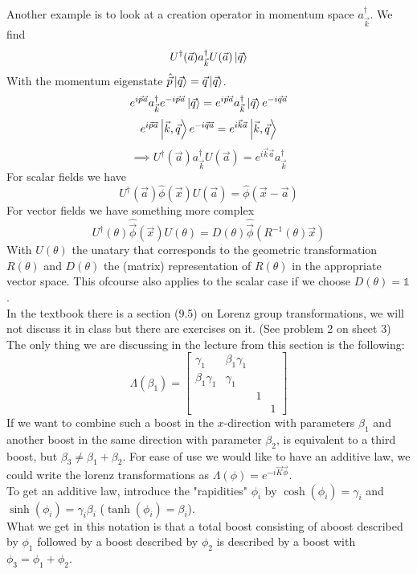 \documentclass{report}
\begin{document}
Another example is to look at a creation operator in momentum space $a^\dagger_{\vec{k}}$. We find  \[
	U^\dagger(\vec{a}) a^\dagger_{\vec{k}} U(\vec{a}) \ket{\vec{q}}
\] With the momentum eigenstate $\hat{\vec{p}} \ket{\vec{q}} = \vec{q} \ket{\vec{q}}$. \[
e^{i\vec{p}\vec{a}} a^\dagger_{\vec{k}} e^{-i \vec{p} \vec{a}} \ket{\vec{q}} = e^{i\vec{p}\vec{a}} a^\dagger_{\vec{k}} \ket{\vec{q}} e^{-i\vec{q}\vec{a}}
\] \[
e^{i\vec{p}\vec{a}} \ket{\vec{k}, \vec{q}} e^{-i \vec{q} \vec{a}} = e^{i\vec{k}\vec{a}} \ket{\vec{k}, \vec{q}}
\] \[
\implies U^\dagger (\vec{a}) a^\dagger_{\vec{k}} U(\vec{a}) = e^{i\vec{k}\vec{a}} a^\dagger_{\vec{k}}
\] 
For scalar fields we have \[
	U^\dagger(\vec{a}) \hat{\phi }(\vec{x}) U(\vec{a}) = \hat{\phi }(\vec{x} - \vec{a})
\] For vector fields we have something more complex \[
U^\dagger (\theta) \hat{\vec{\phi}}(\vec{x}) U(\theta) = D(\theta) \hat{\vec{\phi }} (R^{-1}(\theta) \vec{x})
\] With $U(\theta)$ the unatary that corresponds to the geometric transformation $R(\theta)$ and $D(\theta)$ the (matrix) representation of $R(\theta)$ in the appropriate vector space. This ofcourse also applies to the scalar case if we choose $D(\theta) = \mathbb{1}$.\\
In the textbook there is a section (9.5) on Lorenz group transformations, we will not discuss it in class but there are exercises on it. (See problem 2 on sheet 3)\\
The only thing we are discussing in the lecture from this section is the following: \[
	\Lambda(\beta_1) = \begin{bmatrix} \gamma_1 & \beta_1 \gamma_1 & & \\ \beta_1 \gamma_1 & \gamma_1 & & \\ & & 1 & \\ & & & 1 \end{bmatrix} 
\] If we want to combine such a boost in the $x$-direction with parameters $\beta_1$ and another boost in the same direction with parameter $\beta_2$, is equivalent to a third boost, but $\beta_3 \neq \beta_1 + \beta_2$. For ease of use we would like to have an additive law, we could write the lorenz transformations as $\Lambda(\phi) = e^{-i\vec{K}\vec{\phi}}$.\\
To get an additive law, introduce the "rapidities" $\phi_i$ by $\cosh(\phi_i) = \gamma_i$ and $\sinh(\phi_i) = \gamma_i \beta_i$ ($\tanh(\phi_i) = \beta_i$).\\
What we get in this notation is that a total boost consisting of aboost described by $\phi_1$ followed by a boost described by $\phi_2$ is described by a boost with $\phi_3 = \phi_1 + \phi_2$.
\end{document}
